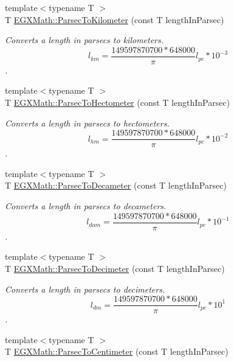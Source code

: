 \begin{DoxyCompactItemize}
{\footnotesize template$<$typename T $>$ }\\T \mbox{\hyperlink{group___e_g_x_math-_conversions-_length_conversions-_astronomical-_parsec-_s_i_gae7136d7d0b81221c5c71de565648fb93}{E\+G\+X\+Math\+::\+Parsec\+To\+Kilometer}} (const T length\+In\+Parsec)
\begin{DoxyCompactList}\small\item\em Converts a length in parsecs to kilometers. \[ l_{km}=\frac{149597870700 * 648000}{\pi}l_{pc} * 10^{-3} \]. \end{DoxyCompactList}\item 
{\footnotesize template$<$typename T $>$ }\\T \mbox{\hyperlink{group___e_g_x_math-_conversions-_length_conversions-_astronomical-_parsec-_s_i_ga8abf21ebe80987ba6668d54e90d46129}{E\+G\+X\+Math\+::\+Parsec\+To\+Hectometer}} (const T length\+In\+Parsec)
\begin{DoxyCompactList}\small\item\em Converts a length in parsecs to hectometers. \[ l_{hm}=\frac{149597870700 * 648000}{\pi}l_{pc} * 10^{-2} \]. \end{DoxyCompactList}\item 
{\footnotesize template$<$typename T $>$ }\\T \mbox{\hyperlink{group___e_g_x_math-_conversions-_length_conversions-_astronomical-_parsec-_s_i_ga69437b0eb33c7cd5df74e32993f9b1e0}{E\+G\+X\+Math\+::\+Parsec\+To\+Decameter}} (const T length\+In\+Parsec)
\begin{DoxyCompactList}\small\item\em Converts a length in parsecs to decameters. \[ l_{dam}=\frac{149597870700 * 648000}{\pi}l_{pc} * 10^{-1} \]. \end{DoxyCompactList}\item 
{\footnotesize template$<$typename T $>$ }\\T \mbox{\hyperlink{group___e_g_x_math-_conversions-_length_conversions-_astronomical-_parsec-_s_i_gaedc7b871291866977df575d69f7eaf6f}{E\+G\+X\+Math\+::\+Parsec\+To\+Decimeter}} (const T length\+In\+Parsec)
\begin{DoxyCompactList}\small\item\em Converts a length in parsecs to decimeters. \[ l_{dm}=\frac{149597870700 * 648000}{\pi}l_{pc} * 10^{1} \]. \end{DoxyCompactList}\item 
{\footnotesize template$<$typename T $>$ }\\T \mbox{\hyperlink{group___e_g_x_math-_conversions-_length_conversions-_astronomical-_parsec-_s_i_ga87c7cdc557184f0451717a0bf04e9d38}{E\+G\+X\+Math\+::\+Parsec\+To\+Centimeter}} (const T length\+In\+Parsec)

\end{DoxyCompactItemize}
